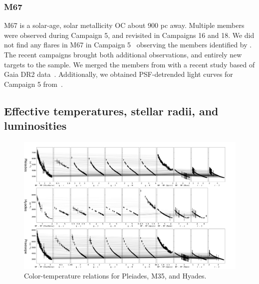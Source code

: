 \documentclass{aa}
\begin{document}
\subsubsection{M67}
M67 is a solar-age, solar metallicity OC about 900 pc away. Multiple members were observed during Campaign 5, and revisited in Campaigns 16 and 18. We did not find any flares in M67 in Campaign 5~ observing the members identified by \citet{gonzalez_m67mem_2016}. The recent campaigns brought both additional observations, and entirely new targets to the sample. We merged the members from \citet{gonzalez_m67mem_2016} with a recent study based of Gaia DR2 data~\citep{gao_m67mem_2018}. Additionally, we obtained PSF-detrended light curves for Campaign 5 from~\citet{nardiello_m67psf_2016}.
\subsection{Effective temperatures, stellar radii, and luminosities}
\label{TeffRL}


   \begin{figure}
		\centering
           \includegraphics[angle=90, width=0.8\hsize]{pics/clusters/Teff_spread_young.png}

      \caption{Color-temperature relations for Pleiades, M35, and Hyades.  }
         \label{pleiades_m35_hyades}
   \end{figure}
   
\end{document}
